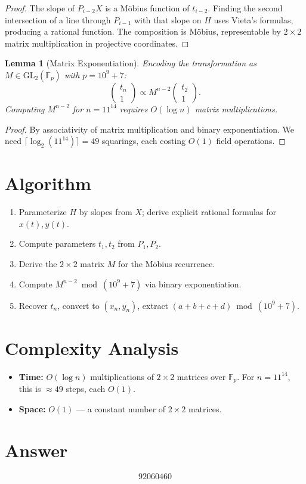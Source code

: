 \documentclass[12pt]{article}
\newtheorem{lemma}[theorem]{Lemma}
\begin{document}
\begin{proof}
The slope of $P_{i-2}X$ is a M\"obius function of $t_{i-2}$. Finding the second intersection of a line through $P_{i-1}$ with that slope on $H$ uses Vieta's formulas, producing a rational function. The composition is M\"obius, representable by $2\times 2$ matrix multiplication in projective coordinates.
\end{proof}

\begin{lemma}[Matrix Exponentiation]
Encoding the transformation as $M \in \mathrm{GL}_2(\mathbb{F}_p)$ with $p = 10^9+7$:
\[
\begin{pmatrix} t_n \\ 1 \end{pmatrix} \propto M^{n-2} \begin{pmatrix} t_2 \\ 1 \end{pmatrix}.
\]
Computing $M^{n-2}$ for $n = 11^{14}$ requires $O(\log n)$ matrix multiplications.
\end{lemma}

\begin{proof}
By associativity of matrix multiplication and binary exponentiation. We need $\lceil \log_2(11^{14}) \rceil = 49$ squarings, each costing $O(1)$ field operations.
\end{proof}

\section{Algorithm}
\begin{enumerate}
    \item Parameterize $H$ by slopes from $X$; derive explicit rational formulas for $x(t), y(t)$.
    \item Compute parameters $t_1, t_2$ from $P_1, P_2$.
    \item Derive the $2\times 2$ matrix $M$ for the M\"obius recurrence.
    \item Compute $M^{n-2} \bmod (10^9+7)$ via binary exponentiation.
    \item Recover $t_n$, convert to $(x_n, y_n)$, extract $(a+b+c+d) \bmod (10^9+7)$.
\end{enumerate}

\section{Complexity Analysis}
\begin{itemize}
    \item \textbf{Time:} $O(\log n)$ multiplications of $2\times 2$ matrices over $\mathbb{F}_p$. For $n = 11^{14}$, this is $\approx 49$ steps, each $O(1)$.
    \item \textbf{Space:} $O(1)$ --- a constant number of $2\times 2$ matrices.
\end{itemize}

\section{Answer}

\[
\boxed{92060460}
\]
\end{document}
